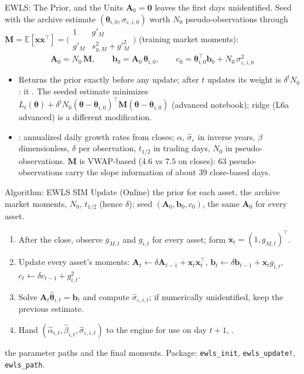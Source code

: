 \documentclass[aspectratio=169,11pt]{beamer}
\newcommand{\E}{\mathbb{E}}
\newcommand{\bx}{\mathbf{x}}
\newcommand{\bA}{\mathbf{A}}
\newcommand{\bb}{\mathbf{b}}
\newcommand{\bM}{\mathbf{M}}
\newcommand{\bth}{\boldsymbol{\theta}}
\newcommand{\thalf}{t_{1/2}}
\begin{document}
\begin{frame}{EWLS: The Prior, and the Units}
  \vspace{-0.3em}
  $\bA_0=\mathbf 0$ leaves the first days unidentified. Seed with the archive
  estimate $(\bth_{i,0},\sigma_{\varepsilon,i,0})$ worth $N_0$ pseudo-observations
  through $\bM=\E[\bx\bx^{\top}]=\bigl(\begin{smallmatrix}1&g'_M\\ g'_M&s^2_{g,M}+g'^{2}_M\end{smallmatrix}\bigr)$
  (training market moments):
  \[
    \boxed{\bA_0=N_0\,\bM,\qquad \bb_0=\bA_0\,\bth_{i,0},\qquad
      c_0=\bth_{i,0}^{\top}\bb_0+N_0\,\sigma^2_{\varepsilon,i,0}}
  \]
  \begin{itemize}\setlength{\itemsep}{0.25em}
    \item Returns the prior exactly before any update; after $t$ updates its
      weight is $\delta^tN_0$: it . The seeded estimate
      minimizes $L_t(\bth)+\delta^tN_0(\bth-\bth_{i,0})^{\top}\bM(\bth-\bth_{i,0})$
      (advanced notebook); ridge (L6a advanced) is a different modification.
    \item {}: annualized daily growth rates from closes; $\alpha$,
      $\hat\sigma_\varepsilon$ in inverse years, $\beta$ dimensionless, $\delta$ per
      observation, $\thalf$ in trading days, $N_0$ in pseudo-observations. $\bM$ is
      VWAP-based ($4.6$ vs $7.5$ on closes): 63 pseudo-observations carry the
      slope information of about 39 close-based days.
  \end{itemize}
\end{frame}

\begin{frame}{Algorithm: EWLS SIM Update (Online)}
  \textbf{} the prior for each asset, the archive market moments,
  $N_0$, $\thalf$ (hence $\delta$); seed $(\bA_0,\bb_0,c_0)$, the same $\bA_0$ for
  every asset.

  \vspace{0.3em}
  \textbf{}
  \begin{enumerate}\setlength{\itemsep}{0.15em}
    \item After the close, observe $g_{M,t}$ and $g_{i,t}$ for every asset; form
      $\bx_t=(1,g_{M,t})^{\top}$.
    \item Update every asset's moments: $\bA_t\leftarrow\delta\bA_{t-1}+\bx_t\bx_t^{\top}$,
      $\bb_t\leftarrow\delta\bb_{t-1}+\bx_tg_{i,t}$, $c_t\leftarrow\delta c_{t-1}+g_{i,t}^2$.
    \item Solve $\bA_t\hat{\bth}_{i,t}=\bb_t$ and compute $\hat\sigma_{\varepsilon,i,t}$;
      if numerically unidentified, keep the previous estimate.
    \item Hand $(\hat\alpha_{i,t},\hat\beta_{i,t},\hat\sigma_{\varepsilon,i,t})$ to the
      engine for use on day $t+1$, .
  \end{enumerate}
  \textbf{} the parameter paths and the final moments. Package:
  \texttt{ewls\_init}, \texttt{ewls\_update!}, \texttt{ewls\_path}.
\end{frame}
\end{document}
